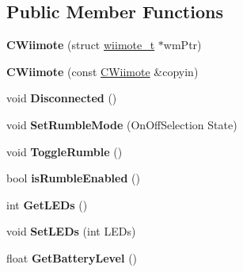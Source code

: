 \subsection*{\-Public \-Member \-Functions}
\begin{DoxyCompactItemize}
\item 
\hypertarget{class_c_wiimote_aea8deb92b4f4c23ff5f619f92f5740bb}{{\bfseries \-C\-Wiimote} (struct \hyperlink{structwiimote__t}{wiimote\-\_\-t} $\ast$wm\-Ptr)}\label{class_c_wiimote_aea8deb92b4f4c23ff5f619f92f5740bb}

\item 
\hypertarget{class_c_wiimote_af907ec89113a3e2ec6f992bb381c6253}{{\bfseries \-C\-Wiimote} (const \hyperlink{class_c_wiimote}{\-C\-Wiimote} \&copyin)}\label{class_c_wiimote_af907ec89113a3e2ec6f992bb381c6253}

\item 
\hypertarget{class_c_wiimote_a39252c75229d1bc9d2acc126304a7ca6}{void {\bfseries \-Disconnected} ()}\label{class_c_wiimote_a39252c75229d1bc9d2acc126304a7ca6}

\item 
\hypertarget{class_c_wiimote_a4945392c6bcfa461bdcc6b8f5ff25ba1}{void {\bfseries \-Set\-Rumble\-Mode} (\-On\-Off\-Selection \-State)}\label{class_c_wiimote_a4945392c6bcfa461bdcc6b8f5ff25ba1}

\item 
\hypertarget{class_c_wiimote_af1908b383e4a700c270af461bf1b209d}{void {\bfseries \-Toggle\-Rumble} ()}\label{class_c_wiimote_af1908b383e4a700c270af461bf1b209d}

\item 
\hypertarget{class_c_wiimote_a332038d26d6b67d6a566cc1789bae118}{bool {\bfseries is\-Rumble\-Enabled} ()}\label{class_c_wiimote_a332038d26d6b67d6a566cc1789bae118}

\item 
\hypertarget{class_c_wiimote_a288872e2efc61d986b4b49e4b868460b}{int {\bfseries \-Get\-L\-E\-Ds} ()}\label{class_c_wiimote_a288872e2efc61d986b4b49e4b868460b}

\item 
\hypertarget{class_c_wiimote_a3526e61d6a51b6fc8406aeca60e92318}{void {\bfseries \-Set\-L\-E\-Ds} (int \-L\-E\-Ds)}\label{class_c_wiimote_a3526e61d6a51b6fc8406aeca60e92318}

\item 
\hypertarget{class_c_wiimote_adb0acbb6196d8782790e818b4babfde7}{float {\bfseries \-Get\-Battery\-Level} ()}\label{class_c_wiimote_adb0acbb6196d8782790e818b4babfde7}


\end{DoxyCompactItemize}
